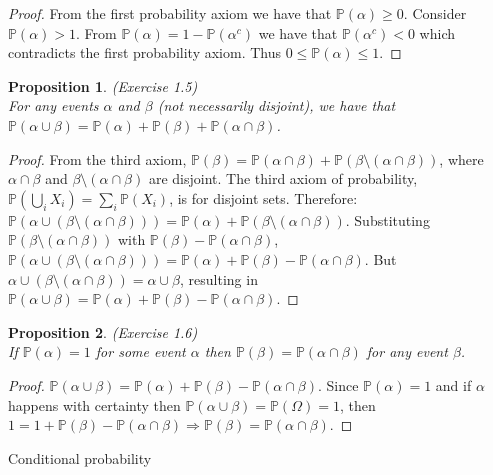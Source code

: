 \documentclass{amsart}
\makeatletter
\def\subsection{\@startsection{subsection}{3}%
  \z@{.5\linespacing\@plus.7\linespacing}{.1\linespacing}%
  {\normalfont\itshape}}
\theoremstyle{plain}
\newtheorem{proposition}{Proposition}
\newcommand{\pr}{\mathbb{P}}
\makeatother
\begin{document}
\begin{proof}
  From the first probability axiom we have that $\pr(\alpha)\geq0$. Consider $\pr(\alpha)>1$. From
  $\pr(\alpha)=1-\pr(\alpha^c)$ we have that $\pr(\alpha^c)<0$ which contradicts the first
  probability axiom. Thus $0\leq\pr(\alpha)\leq1$.
\end{proof}

\begin{proposition} (Exercise 1.5)\\
  For any events $\alpha$ and $\beta$ (not necessarily disjoint), we have that $\pr(\alpha\cup
  \beta)=\pr(\alpha)+\pr(\beta)+\pr(\alpha\cap\beta)$.
\end{proposition}

\begin{proof}
  From the third axiom, $\pr(\beta)=\pr(\alpha\cap\beta)+\pr(\beta\setminus(\alpha\cap\beta))$,
  where $\alpha\cap\beta$ and $\beta\setminus(\alpha\cap\beta)$ are disjoint. The third axiom of
  probability, $\pr(\bigcup_i X_i)=\sum_i\pr(X_i)$, is for disjoint sets. Therefore: $\pr(\alpha
  \cup(\beta\setminus(\alpha\cap\beta)))=\pr(\alpha)+\pr(\beta\setminus(\alpha\cap\beta))$.
  Substituting $\pr(\beta\setminus(\alpha\cap\beta))$ with $\pr(\beta)-\pr(\alpha\cap\beta)$, $\pr(
  \alpha\cup(\beta\setminus(\alpha\cap\beta)))=\pr(\alpha)+\pr(\beta)-\pr(\alpha\cap\beta)$. But
  $\alpha\cup(\beta\setminus(\alpha\cap\beta))=\alpha\cup\beta$, resulting in $\pr(\alpha\cup\beta)
  =\pr(\alpha)+\pr(\beta)-\pr(\alpha\cap\beta)$.
\end{proof}

\begin{proposition} (Exercise 1.6)\\
  If $\pr(\alpha)=1$ for some event $\alpha$ then $\pr(\beta)=\pr(\alpha\cap\beta)$ for any
  event $\beta$.
\end{proposition}

\begin{proof}
  $\pr(\alpha\cup\beta)=\pr(\alpha)+\pr(\beta)-\pr(\alpha\cap\beta)$. Since $\pr(\alpha)=1$ and
  if $\alpha$ happens with certainty then $\pr(\alpha\cup\beta)=\pr(\Omega)=1$, then $1=1+
  \pr(\beta)-\pr(\alpha\cap\beta)\Rightarrow\pr(\beta)=\pr(\alpha\cap\beta)$.
\end{proof}

\subsection{Conditional probability}
\end{document}
